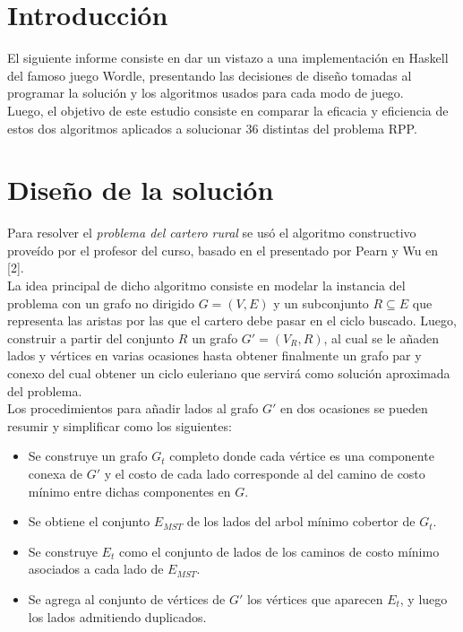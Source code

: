 \documentclass[11pt]{article}
\begin{document}
\newpage

\section{Introducción}

El siguiente informe consiste en dar un vistazo a una implementación en Haskell del famoso juego Wordle, presentando las decisiones de diseño tomadas al programar la solución y los algoritmos usados para cada modo de juego. \\



Luego, el objetivo de este estudio consiste en comparar la eficacia y eficiencia de estos
dos algoritmos aplicados a solucionar 36 distintas del problema RPP.

\section{Diseño de la solución}

Para resolver el \emph{problema del cartero rural} se usó el algoritmo constructivo
proveído por el profesor del curso, basado en el presentado por Pearn y Wu en [2]. \\

La idea principal de dicho algoritmo consiste en modelar la instancia del problema
con un grafo no dirigido $G = (V, E)$ y un subconjunto $R \subseteq E$ que representa
las aristas por las que el cartero debe pasar en el ciclo buscado. Luego, construir a
partir del conjunto $R$ un grafo $G' = (V_R, R)$, al cual se le añaden lados y vértices en varias
ocasiones hasta obtener finalmente un grafo par y conexo del cual obtener un ciclo
euleriano que servirá como solución aproximada del problema. \\

Los procedimientos para añadir lados al grafo $G'$ en dos ocasiones
se pueden resumir y simplificar como los siguientes:

\begin{itemize}
   \item Se construye un grafo $G_t$ completo donde cada vértice
   es una componente conexa de $G'$ y el costo de cada lado corresponde
   al del camino de costo mínimo entre dichas componentes en $G$.
   
   \item Se obtiene el conjunto $E_{MST}$ de los lados del arbol mínimo
   cobertor de $G_t$.

   \item Se construye $E_t$ como el conjunto de lados de los
   caminos de costo mínimo asociados a cada lado de $E_{MST}$.

   \item Se agrega al conjunto de vértices de $G'$ los
   vértices que aparecen $E_t$, y luego los lados admitiendo
   duplicados.
\end{itemize}
\end{document}
